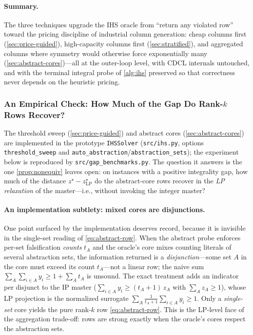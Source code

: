 \paragraph{Summary.} The three techniques upgrade the IHS oracle from
``return any violated row'' toward the pricing discipline of industrial
column generation: cheap columns first (\cref{sec:price-guided}),
high-capacity columns first (\cref{sec:stratified}), and aggregated
columns where symmetry would otherwise force exponentially many
(\cref{sec:abstract-cores})---all at the outer-loop level, with CDCL
internals untouched, and with the terminal integral probe of
\cref{alg:ihs} preserved so that correctness never depends on the
heuristic pricing.

\subsubsection{An Empirical Check: How Much of the Gap Do Rank-\texorpdfstring{$k$}{k} Rows Recover?}
\label{sec:gap-empirical}

The threshold sweep (\cref{sec:price-guided}) and abstract cores
(\cref{sec:abstract-cores}) are implemented in the prototype
\texttt{IHSSolver} (\texttt{src/ihs.py}, options \texttt{threshold\_sweep}
and \texttt{auto\_abstraction}/\texttt{abstraction\_sets}); the experiment
below is reproduced by \texttt{src/gap\_benchmarks.py}. The question it
answers is the one \cref{prop:nonequiv} leaves open: on instances with a
positive integrality gap, how much of the distance $z^\star -
z^\star_{\mathrm{LP}}$ do the abstract-core rows recover in the \emph{LP
relaxation} of the master---i.e., without invoking the integer master?

\paragraph{An implementation subtlety: mixed cores are disjunctions.}
One point surfaced by the implementation deserves record, because it is
invisible in the single-set reading of \eqref{eq:abstract-row}. When the
abstract probe enforces per-set falsification \emph{counts} $t_A$ and the
oracle's core mixes counting literals of several abstraction sets, the
information returned is a \emph{disjunction}---some set $A$ in the core
must exceed its count $t_A$---not a linear row; the naive sum
$\sum_{A} \sum_{i \in A} y_i \ge 1 + \sum_A t_A$ is unsound. The exact
treatment adds an indicator per disjunct to the IP master
($\sum_{i\in A} y_i \ge (t_A{+}1)\,z_A$ with $\sum_A z_A \ge 1$), whose LP
projection is the normalized surrogate
$\sum_A \tfrac{1}{t_A+1} \sum_{i \in A} y_i \ge 1$. Only a
\emph{single-set} core yields the pure rank-$k$ row
\eqref{eq:abstract-row}. This is the LP-level face of the aggregation
trade-off: rows are strong exactly when the oracle's cores respect the
abstraction sets.


